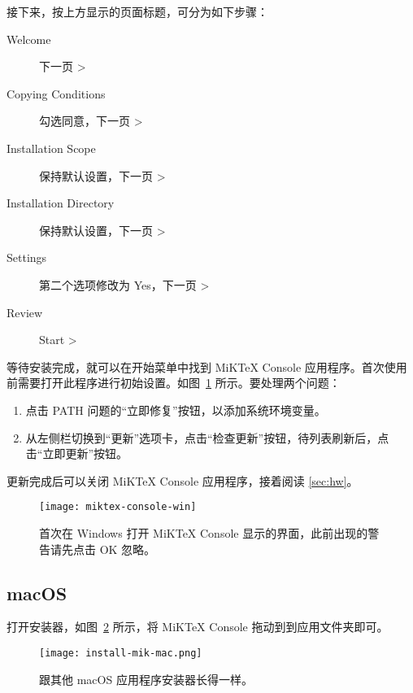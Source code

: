 接下来，按上方显示的页面标题，可分为如下步骤：

\begin{description}
  \item[Welcome] 下一页 >
  \item[Copying Conditions] 勾选同意，下一页 >
  \item[Installation Scope] 保持默认设置，下一页 >
  \item[Installation Directory] 保持默认设置，下一页 >
  \item[Settings] 第二个选项修改为 Yes，下一页 >
  \item[Review] Start >
\end{description}

等待安装完成，就可以在开始菜单中找到 MiKTeX Console 应用程序。首次使用前需要打开此程序进行初始设置。如图~\ref{fig:miktex-console-win} 所示。要处理两个问题：
\begin{enumerate}
  \item 点击 PATH 问题的“立即修复”按钮，以添加系统环境变量。
  \item 从左侧栏切换到“更新”选项卡，点击“检查更新”按钮，待列表刷新后，点击“立即更新”按钮。
\end{enumerate}

\begin{widepar}
更新完成后可以关闭 MiKTeX Console 应用程序，接着阅读 \ref{sec:hw}。
\end{widepar}

\begin{figure}[htbp]
  \caption{首次在 Windows 打开 MiKTeX Console 显示的界面，此前出现的警告请先点击 OK 忽略。}
  \label{fig:miktex-console-win}
  \texttt{[image: miktex-console-win]}
\end{figure}

\subsection{macOS}
\label{subsec:mik-mac}

\begin{widepar}
打开安装器，如图~\ref{fig:install-mik-mac} 所示，将 MiKTeX Console 拖动到到应用文件夹即可。
\end{widepar}

\begin{figure}[htbp]
  \caption{跟其他 macOS 应用程序安装器长得一样。}
  \label{fig:install-mik-mac}
  \texttt{[image: install-mik-mac.png]}
\end{figure}

